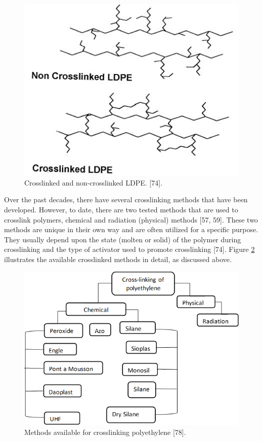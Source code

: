 \documentclass[12pt]{report}
\begin{document}
\begin{figure}[H]
    \centering
    \includegraphics[width=.6\textwidth]{crosslinked_and_non_crosslinked_ldpe.jpg}
    \caption{Crosslinked and non-crosslinked LDPE. [74].}
    \label{ch3:figure:ldpe}
\end{figure}

Over the past decades, there have several crosslinking methods that have been developed. However, to date, there are two tested methods that are used to crosslink polymers, chemical and radiation (physical) methods [57, 59]. These two methods are unique in their own way and are often utilized for a specific purpose. They usually depend upon the state (molten or solid) of the polymer during crosslinking and the type of activator used to promote crosslinking [74]. Figure \ref{ch3:figure:crosslinking_methods} illustrates the available crosslinked methods in detail, as discussed above.

\begin{figure}[H]
    \centering
    \includegraphics[width=.75\textwidth]{methods_available_for_crosslinking_polyethylene.png}
    \caption{Methods available for crosslinking polyethylene [78].}
    \label{ch3:figure:crosslinking_methods}
\end{figure}
\end{document}
